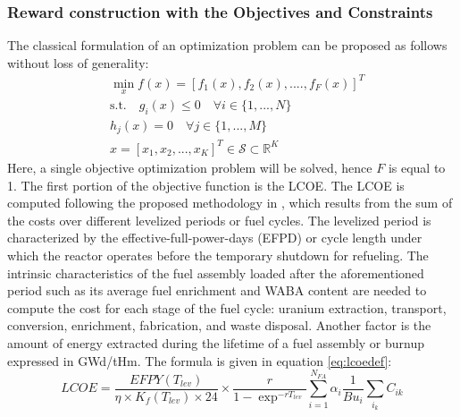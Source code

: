 \documentclass[a4paper]{article}
\begin{document}
\subsubsection{Reward construction with the Objectives and Constraints}
\label{sec:objandconstr}
The classical formulation of an optimization problem can be proposed as follows without loss of generality:
\begin{align*}
    &\min_{x} f(x) = [f_1(x),f_2(x),....,f_F(x)]^T \\
    &\text{s.t.} \quad g_i(x) \le 0 \quad \forall i\in \{1,...,N\} \\
     & h_j(x) = 0 \quad \forall j\in \{1,...,M\}\\
     & x = [x_1,x_2,...,x_K]^T \in \mathcal{S} \subset \mathbb{R}^K
\end{align*}
\label{eq:fObj}
\noindent
Here, a single objective optimization problem will be solved, hence $F$ is equal to 1. The first portion of the objective function is the LCOE. The LCOE is computed following the proposed methodology in \cite{saccheri2004atight}, which results from the sum of the costs over different levelized periods or fuel cycles. The levelized period is characterized by the effective-full-power-days (EFPD) or cycle length under which the reactor operates before the temporary shutdown for refueling. The intrinsic characteristics of the fuel assembly loaded after the aforementioned period such as its average fuel enrichment and WABA content are needed to compute the cost for each stage of the fuel cycle: uranium extraction, transport, conversion, enrichment, fabrication, and waste disposal. Another factor is the amount of energy extracted during the lifetime of a fuel assembly or burnup expressed in GWd/tHm. The formula is given in equation \ref{eq:lcoedef}:
\begin{equation}
    LCOE = \frac{EFPY(T_{lev})}{\eta \times K_f(T_{lev}) \times 24} \times \frac{r}{1 - \exp^{-rT_{lev}}} \sum_{i = 1}^{N_{FA}}\alpha_i\frac{1}{Bu_i}\sum_{i_k}C_{ik}
    \label{eq:lcoedef}
\end{equation}
\end{document}
